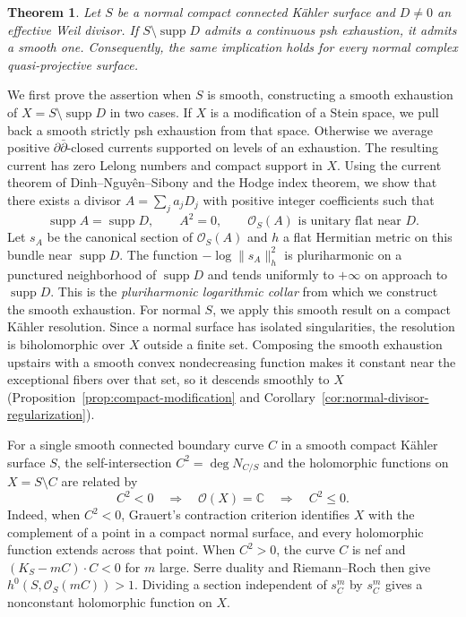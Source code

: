 \documentclass[11pt]{amsart}
\newtheorem{theorem}{Theorem}[section]
\theoremstyle{definition}
\theoremstyle{remark}
\numberwithin{equation}{section}
\newcommand{\C}{\mathbb C}
\newcommand{\OO}{\mathcal O}
\newcommand{\barp}{\bar\partial}
\newcommand{\supp}{\operatorname{supp}}
\begin{document}
\begin{theorem}\label{thm:surface-introduction}
Let $S$ be a normal compact connected K\"ahler surface and $D\ne0$
an effective Weil divisor. If $S\setminus\supp D$ admits a continuous
psh exhaustion, it admits a smooth one. Consequently, the same
implication holds for every normal complex quasi-projective surface.
\end{theorem}

We first prove the assertion when $S$ is smooth, constructing a
smooth exhaustion of $X=S\setminus\supp D$ in two cases.
If $X$ is a modification of a Stein space, we pull back a smooth
strictly psh exhaustion from that space. Otherwise we average positive $\partial\barp$-closed currents
supported on levels of an exhaustion. The resulting current has zero
Lelong numbers and compact support in $X$. Using the current theorem
of Dinh--Nguy\^en--Sibony \cite{DNS22} and the Hodge index theorem,
we show that there exists a divisor $A=\sum_j a_jD_j$ with positive
integer coefficients such that
\[
\supp A=\supp D,\qquad A^2=0,\qquad
\OO_S(A)\text{ is unitary flat near }D.
\]
Let $s_A$ be the canonical section of $\OO_S(A)$ and $h$ a flat
Hermitian metric on this bundle near $\supp D$. The function $-\log\|s_A\|_h^2$
is pluriharmonic on a punctured neighborhood of $\supp D$ and tends
uniformly to $+\infty$ on approach to $\supp D$. This is the
\emph{pluriharmonic logarithmic collar} from which we construct the
smooth exhaustion.
For normal $S$, we apply this smooth result on a compact K\"ahler
resolution. Since a normal surface has isolated singularities, the
resolution is biholomorphic over $X$ outside a finite set. Composing
the smooth exhaustion upstairs with a smooth convex nondecreasing
function makes it constant near the exceptional fibers over that
set, so it descends smoothly to $X$
(Proposition~\ref{prop:compact-modification} and
Corollary~\ref{cor:normal-divisor-regularization}).

For a single smooth connected boundary curve $C$ in a smooth compact
K\"ahler surface $S$, the self-intersection
$C^2=\deg N_{C/S}$ and the holomorphic functions
on $X=S\setminus C$ are related by
\[
 C^2<0\quad\Longrightarrow\quad\OO(X)=\C
      \quad\Longrightarrow\quad C^2\le0.
\]
Indeed, when $C^2<0$, Grauert's contraction criterion
\cite[\S4, 8(e)]{Grauert1962} identifies $X$ with the complement of
a point in a compact normal surface, and every holomorphic function
extends across that point. When $C^2>0$, the curve $C$ is nef and
$(K_S-mC)\cdot C<0$ for $m$ large. Serre duality and Riemann--Roch
then give $h^0(S,\OO_S(mC))>1$. Dividing a section independent
of $s_C^m$ by $s_C^m$ gives a nonconstant holomorphic function on $X$.
\end{document}
